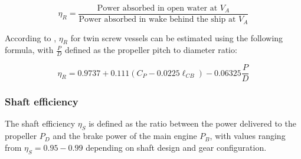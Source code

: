 \begin{equation}
    \label{eqn: n_rot_MAN}
    \eta_R = \frac{\text{Power absorbed in open water at }V_A}{\text{Power absorbed in wake behind the ship at }V_A}
\end{equation}

According to , $\eta_R$ for twin screw vessels can be estimated using the following formula, with $\frac{P}{D}$ defined as the propeller pitch to diameter ratio:

\begin{equation}
    \label{eqn: eta_rot_holtrop}
    \eta_R = 0.9737 + 0.111(C_P-0.0225\ell_{CB}) - 0.06325\frac{P}{D}
\end{equation}

\subsubsection*{Shaft efficiency}

The shaft efficiency $\eta_S$ is defined as the ratio between the power delivered to the propeller $P_D$ and the brake power of the main engine $P_B$, with values ranging from $\eta_S = 0.95 - 0.99$ depending on shaft design and gear configuration.




    










